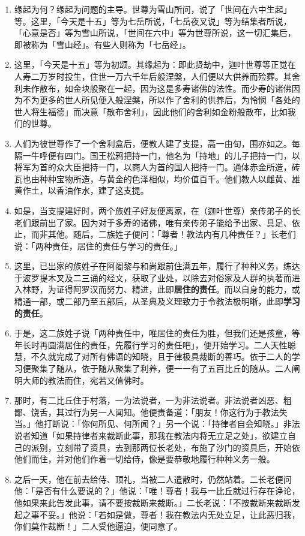 \begin{enumerate}\item 缘起为何？缘起为问题的主导。世尊为雪山所问，说了「世间在六中生起」等。这里，「今天是十五」等为七岳所说，「七岳夜叉说」等为结集者所说，「心意是否」等为雪山所说，「世间在六中」等为世尊所说，这一切汇集后，即被称为「雪山经」。有些人则称为「七岳经」。
\item 这里，「今天是十五」等为初颂。其缘起为：即此贤劫中，迦叶世尊等正觉在人寿二万岁时投生，住世一万六千年后般涅槃，人们便以大供养而殓葬。其舍利未作散布，如金块般聚在一起，因为这是多寿诸佛的法性。而少寿的诸佛因为不为更多的世人所见便入般涅槃，所以作了舍利的供养后，为怜悯「各处的世人将生福德」而决意「散布舍利」，因此他们的舍利如金粉般散布，比如我们的世尊。
\item 人们为彼世尊作了一个舍利盒后，便教人建了支提，高一由旬，围亦如之。每隔一牛呼便有四门。国王松鸦把持一门，他名为「持地」的儿子把持一门，以将军为首的众大臣把持一门，以商人为首的国人把持一门。通体赤金所造，砖瓦也由种种宝物所造，与黄金的色泽相似，均价值百千。他们教人以雌黄、雄黄作土，以香油作水，建了这支提。
\item 如是，当支提建好时，两个族姓子好友便离家，在（迦叶世尊）亲传弟子的长老们跟前出了家。因为对于多寿的诸佛，唯有亲传弟子能给予出家、具足、依止，而非其他。随后，二族姓子便问：「尊者！教法内有几种责任？」长老们说：「两种责任，居住的责任与学习的责任。」
\item 这里，已出家的族姓子在阿阇黎与和尚跟前住满五年，履行了种种义务，练达于波罗提木叉及二三诵的经文，获取了业处，以除去对俗家及人群的执著而进入林野，为证得阿罗汉而努力、精进，此即\textbf{居住的责任}。而以自身的能力，或精通一部，或二部乃至五部后，从圣典及义理致力于令教法极明晰，此即\textbf{学习的责任}。
\item 于是，这二族姓子说「两种责任中，唯居住的责任为胜，但我们还是孩童，等年长时再圆满居住的责任，先履行学习的责任吧」，便开始学习。二人天性聪慧，不久就完成了对所有佛语的知晓，且于律极具裁断的善巧。依于二人的学习便聚集了随从，依于随从聚集了利养，便一一有了五百比丘的随从。二人阐明大师的教法而住，宛若又值佛时。
\item 那时，有二比丘住于村落，一为法说者，一为非法说者。非法说者凶恶、粗鄙、饶舌，其过行为另一人闻知。他便责备道：「朋友！你这行为于教法失当。」他打断说：「你何所见、何所闻？」另一个说：「持律者自会知晓。」非法说者知道「如果持律者来裁断此事，那我在教法内将无立足之处」，欲建立自己的派别，立刻带了资具，去到那两位长老处，布施了沙门的资具后，开始依他们而住，并对他们作着一切给侍，像是要恭敬地履行种种义务一般。
\item 之后一天，他在前去给侍、顶礼，当被二人遣散时，仍然站着。二长老便问他：「是否有什么要说的？」他说：「唯！尊者！我与一比丘就过行存在诤论，他如果来此告发此事，请不要按裁断来裁断。」二长老说：「不按裁断来裁断发起之事不妥。」他说：「若如是做，尊者！我在教法内无处立足，让此恶归我，你们莫作裁断！」二人受他逼迫，便同意了。

\end{enumerate}
